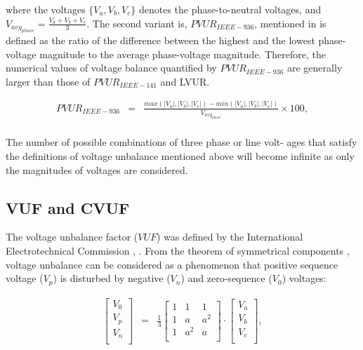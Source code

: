 where the voltages $\{V_{a},V_{b},V_{c}\}$ denotes the phase-to-neutral voltages, and $V_{avg_{phase}}=\frac{V_{a}+V_{b}+V_{c}}{3}$.
The second variant is, $PVUR_{IEEE-936}$, mentioned in \cite{IEEE_936_29053} is defined as the ratio of the difference between the highest and the lowest phase-voltage magnitude to the average phase-voltage magnitude. Therefore, the numerical values of voltage balance quantified by $PVUR_{IEEE-936}$ are generally larger than those of $PVUR_{IEEE-141}$ and LVUR. 

\begin{equation}
        \begin{array}{rcl}
            PVUR_{IEEE-936}&=&\frac{max\left( |V_a|,|V_b|,|V_c| \right)-min\left( |V_a|,|V_b|,|V_c| \right)}{V_{avg_{phase}}}\times100,\\					
        \end{array}
        \label{BASICUNB:equ:PVUR-936}
    \end{equation}
		
The number of possible combinations of three phase or line volt- ages that satisfy the definitions of voltage unbalance mentioned above will become infinite as only the magnitudes of voltages are considered.	
		
	
	\subsection{VUF and CVUF}\label{BASICUNB:sec:VUFCVUF}
	
	The voltage unbalance factor ($VUF$) was defined by the International Electrotechnical Commission \cite{pillay2001definitions}, \cite{dugan1996electrical}. From the theorem of symmetrical components \cite{fortescue1918method}, voltage unbalance can be considered as a phenomenon that positive sequence voltage  ($V_p$) is disturbed by negative  ($V_n$) and zero-sequence ($V_0$) voltages:
	
	\begin{equation}
        \begin{array}{rcl}
            \begin{bmatrix}
						V_0\\
						V_p\\
						V_n\\
						\end{bmatrix}&=&
						\frac{1}{3}\begin{bmatrix}
						1&1&1\\
						1&a&a^2\\
						1&a^2&a\\
						\end{bmatrix}\cdot
						\begin{bmatrix}
						V_a\\
						V_b\\
						V_c\\
						\end{bmatrix},\\
        \end{array}
        \label{BASICUNB:equ:symmetry}
    \end{equation}
	
